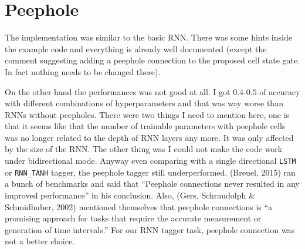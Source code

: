 \documentclass[11pt]{article} %
\begin{document}
\section{Peephole}

The implementation was similar to the basic RNN. There was some hints inside the example code and everything is already well documented (except the comment suggesting adding a peephole connection to the proposed cell state gate. In fact nothing needs to be changed there).

On the other hand the performances was not good at all. I got $0.4$-$0.5$ of accuracy with different combinations of hyperparameters and that was way worse than RNNs without peepholes. There were two things I need to mention here, one is that it seems like that the number of trainable parameters with peephole cells was no longer related to the depth of RNN layers any more. It was only affected by the size of the RNN. The other thing was I could not make the code work under bidirectional mode. Anyway even comparing with a single directional \verb|LSTM| or \verb|RNN_TANH| tagger, the peephole tagger still underperformed. (Breuel, 2015) ran a bunch of benchmarks and said that ``Peephole connections never resulted in any improved performance'' in his conclusion.\cite{breuel2015benchmarking} Also, (Gers, Schraudolph \& Schmidhuber, 2002) mentioned themselves that peephole connections is ``a promising approach for tasks that require the accurate measurement or generation of time intervals.''\cite{gers2002learning} For our RNN tagger task, peephole connection was not a better choice.
\end{document}
